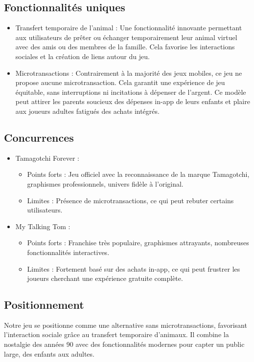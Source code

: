 \documentclass{rapportECL}
\begin{document}
\subsection{Fonctionnalités uniques}
\begin{itemize}[label=\textbullet]
\item Transfert temporaire de l’animal :
Une fonctionnalité innovante permettant aux utilisateurs de prêter ou échanger temporairement
leur animal virtuel avec des amis ou des membres de la famille. Cela favorise les interactions
sociales et la création de liens autour du jeu.
\item Microtransactions :
Contrairement à la majorité des jeux mobiles, ce jeu ne propose aucune microtransaction. Cela
garantit une expérience de jeu équitable, sans interruptions ni incitations à dépenser de l’argent.
Ce modèle peut attirer les parents soucieux des dépenses in-app de leurs enfants et plaire aux
joueurs adultes fatigués des achats intégrés.
\end{itemize}
\subsection{Concurrences}
\begin{itemize}[label=\textbullet]
\item Tamagotchi Forever :
\begin{itemize}[label=\textendash]
\item Points forts : Jeu officiel avec la reconnaissance de la marque Tamagotchi,
graphismes professionnels, univers fidèle à l’original.
\item Limites : Présence de microtransactions, ce qui peut rebuter certains utilisateurs.
\end{itemize}
\item My Talking Tom :
\begin{itemize}[label=\textendash]
\item Points forts : Franchise très populaire, graphismes attrayants, nombreuses
fonctionnalités interactives.
\item Limites : Fortement basé sur des achats in-app, ce qui peut frustrer les joueurs
cherchant une expérience gratuite complète.
\end{itemize}
\end{itemize}
\subsection{Positionnement}
Notre jeu se positionne comme une alternative sans microtransactions, favorisant l’interaction
sociale grâce au transfert temporaire d’animaux. Il combine la nostalgie des années 90 avec des
fonctionnalités modernes pour capter un public large, des enfants aux adultes.
\end{document}
